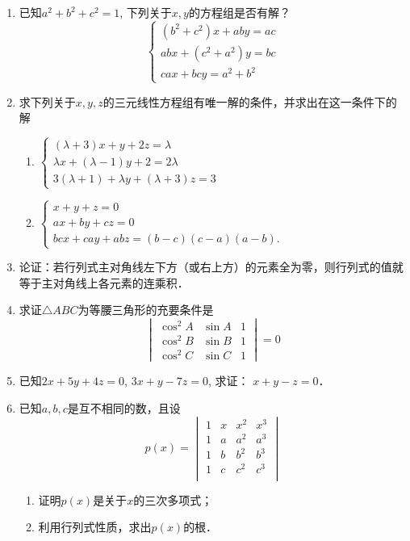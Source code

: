 \begin{enumerate}
\item 已知$a^2+b^2+c^2=1$, 下列关于$x,y$的方程组是否有解？
\[\begin{cases}
    (b^2+c^2)x+aby=ac\\
    abx+ (c^2+a^2) y=bc\\
    cax+bcy=a^2+b^2
\end{cases}\]


\item 求下列关于$x,y,z$的三元线性方程组有唯一解的条件，并求出在这一条件下的解
\begin{enumerate}
    \item $\begin{cases}
        (\lambda+3) x+y+2z=\lambda\\
        \lambda x+ (\lambda-1) y+2=2\lambda\\
3 (\lambda+1) +\lambda y+ (\lambda+3) z=3
    \end{cases}$
    \item $\begin{cases}
        x+y+z=0\\
        ax+by+cz=0\\
        bcx+cay+abz= (b-c) (c-a)(a-b).
    \end{cases}$
\end{enumerate}


\item 论证：若行列式主对角线左下方（或右上方）的元素全为零，则行列式的值就等于主对角线上各元素的连乘积．


\item 求证$\triangle ABC$为等腰三角形的充要条件是
\[\begin{vmatrix}
    \cos^2A& \sin A &1\\
    \cos^2B& \sin B &1\\
    \cos^2C& \sin C &1
\end{vmatrix}=0\]

\item 已知$2x+5y+4z=0$, $3x+y-7z=0$, 求证：
$x+y-z=0$．
\item 已知$a,b,c$是互不相同的数，且设
\[p (x) =\begin{vmatrix}
    1&x&x^2&x^3\\
    1&a&a^2&a^3\\
    1&b&b^2&b^3\\
    1&c&c^2&c^3\\
\end{vmatrix}\]
\begin{enumerate}
    \item 证明$p(x)$是关于$x$的三次多项式；
    \item 利用行列式性质，求出$p(x)$的根．
\end{enumerate}



\end{enumerate}